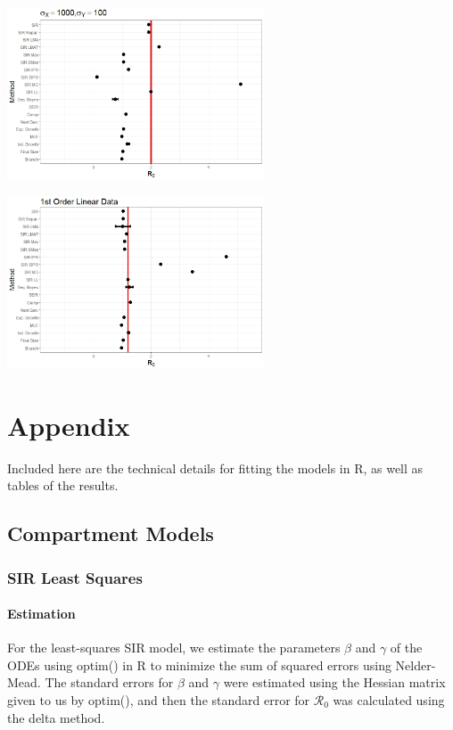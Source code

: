 \documentclass[12pt]{article}
\newcommand{\rr}{\ensuremath{\mathcal{R}_0}}
\begin{document}
\begin{minipage}{0.5\linewidth}
	\includegraphics[width=3in]{VarianceFP.jpeg}
\end{minipage}
\begin{minipage}{0.5\linewidth}
	\includegraphics[width=3in]{OtherFP.jpeg}
\end{minipage}




\section{Appendix}

Included here are the technical details for fitting the models in R, as well as tables of the results.

\subsection{Compartment Models}

\subsubsection{SIR Least Squares}

\paragraph{Estimation}

For the least-squares SIR model, we estimate the parameters $\beta$ and $\gamma$ of the ODEs using optim() in R to minimize the sum of squared errors using Nelder-Mead. The standard errors for $\beta$ and $\gamma$ were estimated using the Hessian matrix given to us by optim(), and then the standard error for $\rr$ was calculated using the delta method.
\end{document}
